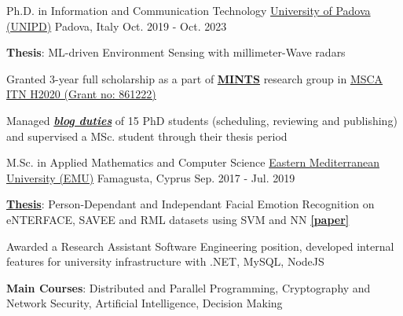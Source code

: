 

\begin{cventries}

  \cventry
    {Ph.D. in Information and Communication Technology} %
    {\href{https://www.unipd.it/}{University of Padova (UNIPD)}} %
    {Padova, Italy} %
    {Oct. 2019 - Oct. 2023} %
    {
      \begin{cvitems} %
        \item {\textbf{Thesis}: ML-driven Environment Sensing with millimeter-Wave radars}
        \item {Granted 3-year full scholarship as a part of \href{https://www.b5g-mints.eu/}{\textbf{MINTS}} research group in \href{https://cordis.europa.eu/project/id/861222}{MSCA ITN H2020 (Grant no: 861222)}}
        \item {Managed \href{https://b5g-mints.eu/blog/}{\textit{\textbf{blog duties}}} of 15 PhD students (scheduling, reviewing and publishing) and supervised a MSc. student through their thesis period}
      \end{cvitems}
    }
  
  \cventry
    {M.Sc. in Applied Mathematics and Computer Science} %
    {\href{https://www.emu.edu.tr/en}{Eastern Mediterranean University (EMU)}} %
    {Famagusta, Cyprus} %
    {Sep. 2017 - Jul. 2019} %
    {
      \begin{cvitems} %
        \item {\href{http://i-rep.emu.edu.tr:8080/xmlui/handle/11129/5291}{\textbf{Thesis}}: Person-Dependant and Independant Facial Emotion Recognition on eNTERFACE, SAVEE and RML datasets using SVM and NN \href{https://link.springer.com/article/10.1007/s11760-020-01830-0}{\textbf{[paper]}}}
        \item {Awarded a Research Assistant Software Engineering position, developed internal features for university infrastructure with .NET, MySQL, NodeJS}
        \item {\textbf{Main Courses}: Distributed and Parallel Programming, Cryptography and Network Security, Artificial Intelligence, Decision Making}
      \end{cvitems}
    }


\end{cventries}
